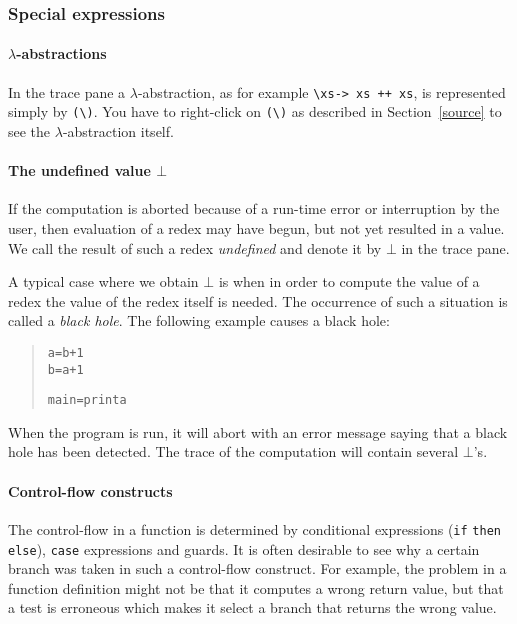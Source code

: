 \documentclass[12pt]{article}
\newenvironment{code}{\begin{quote}\begin{alltt}}{\end{alltt}\end{quote}}
\begin{document}
\subsubsection{Special expressions}

\paragraph{$\lambda$-abstractions}

In the trace pane a $\lambda$-abstraction, as for example 
\verb?\xs-> xs ++ xs?,
is represented simply by \verb?(\)?.
You have to right-click on \verb?(\)? as described in Section~\ref{source} to see the $\lambda$-abstraction itself.

\paragraph{The undefined value $\bot$}

If the computation is aborted because of a run-time error or interruption by the user, then evaluation of a redex may have begun, but not yet resulted in a value. We call the result of such a redex \emph{undefined} and denote it by $\bot$ in the trace pane.

A typical case where we obtain $\bot$ is when in order to compute the value of a redex the value of the redex itself is needed. The occurrence of such a situation is called a \emph{black hole}. The following example causes a black hole:

\begin{code}
a = b + 1
b = a + 1

main = print a
\end{code}

When the program is run, it will abort with an error message saying that a black hole has been detected. The trace of the computation will contain several $\bot$'s.


\paragraph{Control-flow constructs}

The control-flow in a function is determined by conditional expressions (\texttt{if} \texttt{then} \texttt{else}), \texttt{case} expressions and guards. 
It is often desirable to see why a certain branch was taken in such a control-flow construct. For example, the problem in a function definition might not be that it computes a wrong return value, but that a test is erroneous which makes it select a branch that returns the wrong value. 
\end{document}
